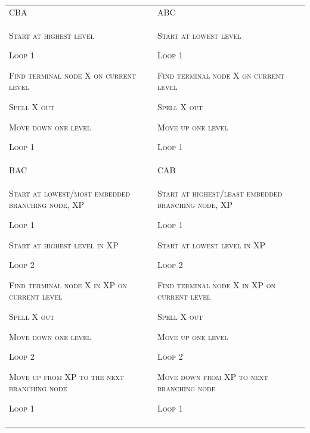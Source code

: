 \begin{tabularx}{\textwidth}{XX}
\lsptoprule
CBA & ABC\\
\textsc{Start at highest level}

\textsc{Loop 1}

     \textsc{Find terminal node X on current level}

     \textsc{Spell X out}

     \textsc{Move down one level}

\textsc{Loop 1} & \textsc{Start at lowest level}

\textsc{Loop 1}

     \textsc{Find terminal node X on current level}

     \textsc{Spell X out}

     \textsc{Move up one level}

\textsc{Loop 1}\\
BAC & CAB\\
\textsc{Start at lowest}\textsc{/}\textsc{most embedded branching node, XP}

\textsc{Loop 1}

      \textsc{Start at highest level in XP}

      \textsc{Loop 2}

         \textsc{Find terminal node X in XP on current level}

         \textsc{Spell X out}

         \textsc{Move down one level}

      \textsc{Loop 2}

      \textsc{Move up from XP to the next branching node}

\textsc{Loop 1} & \textsc{Start at highest}\textsc{/}\textsc{least embedded branching node, XP}

\textsc{Loop 1}

      \textsc{Start at lowest level in XP}

      \textsc{Loop 2}

         \textsc{Find terminal node X in XP on current level}

         \textsc{Spell X out}

         \textsc{Move up one level}

      \textsc{Loop 2}

      \textsc{Move down from XP to next branching node}

\textsc{Loop 1}\\
\lspbottomrule
\end{tabularx}
